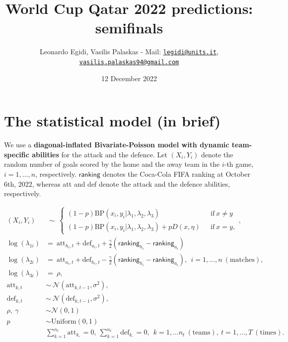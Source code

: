 \documentclass[
  10pt,
]{article}
\title{World Cup Qatar 2022 predictions: semifinals}
\author{Leonardo Egidi, Vasilis Palaskas - Mail:
\href{mailto:legidi@units.it}{\nolinkurl{legidi@units.it}},
\href{mailto:vasilis.palaskas94@gmail.com}{\nolinkurl{vasilis.palaskas94@gmail.com}}}
\date{12 December 2022}
\begin{document}
\maketitle

{
\setcounter{tocdepth}{2}
\tableofcontents
}
\hypertarget{the-statistical-model-in-brief}{%
\section{The statistical model (in
brief)}\label{the-statistical-model-in-brief}}

We use a \textbf{diagonal-inflated Bivariate-Poisson model with dynamic
team-specific abilities} for the attack and the defence. Let
\((X_{i}, Y_{i})\) denote the random number of goals scored by the home
and the away team in the \(i\)-th game, \(i=1,\ldots,n\), respectively.
\(\mathsf{ranking}\) denotes the Coca-Cola FIFA ranking at October 6th,
2022, whereas att and def denote the attack and the defence abilities,
respectively.

\begin{align}
(X_i, Y_i) &\ \sim \ \begin{cases} (1-p) \text{BP}(x_i, y_i |\lambda_1, \lambda_2, \lambda_3) \ \ \ & \text{if} \    x \ne y \\ (1-p) \text{BP}(x_i, y_i | \lambda_1, \lambda_2, \lambda_3) + pD(x, \eta) \ \ \ & \text{if} \   x = y, \end{cases}, \\
\log(\lambda_{1i}) &=\    \text{att}_{h_i, t}+ \text{def}_{a_i,t} + \frac{\gamma}{2}(\mathsf{ranking}_{h_i}-\mathsf{ranking}_{a_i}) \\
\log(\lambda_{2i}) & =\    \text{att}_{a_i,t} + \text{def}_{h_i,t} - \frac{\gamma}{2}(\mathsf{ranking}_{h_i}-\mathsf{ranking}_{a_i}), \ \ i=1,\ldots,n\ (\text{matches}), \\
\log(\lambda_{3i}) & =\ \rho,\\
\text{att}_{k, t}&  \sim \ \mathcal{N}(\text{att}_{k, t-1}, \sigma^2), \\
\text{def}_{k, t} & \sim \  \mathcal{N}(\text{def}_{k, t-1}, \sigma^2),\\
\rho, \ \gamma & \sim \mathcal{N}(0,1) \\
p & \sim \text{Uniform}(0,1)\\
& \sum_{k=1}^{n_t} \text{att}_{k, }=0, \  \sum_{k=1}^{n_t}\text{def}_{k, }=0, \ \ k=1,\ldots n_t \ (\text{teams}), \  t=1,\ldots, T \ (\text{times}).
\label{eq:scoring_rue}
\end{align}
\end{document}
